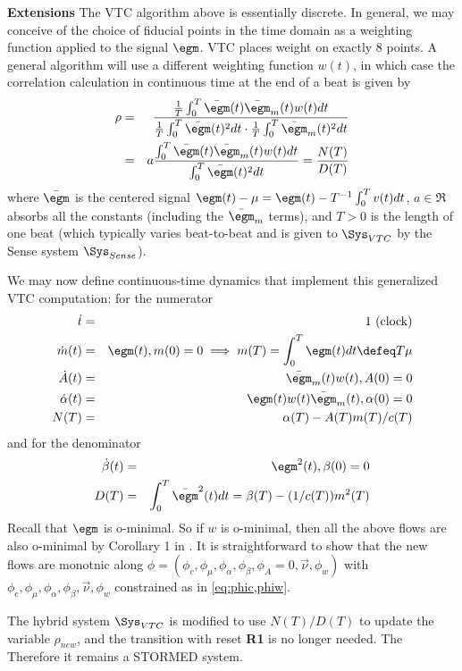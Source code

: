\textbf{Extensions}
The VTC algorithm above is essentially discrete.
In general, we may conceive of the choice of fiducial points in the time domain as a weighting function applied to the signal $\egm$.
VTC places weight on exactly 8 points. 
A general algorithm will use a different weighting function $w(t)$, in which case the correlation calculation in continuous time at the end of a beat is given by
\begin{eqnarray*}\rho &=& \frac{\frac{1}{T}\int_{0}^{T}\bar{\egm}(t)\bar{\egm}_m(t)w(t)dt}{\frac{1}{T}\int_{0}^{T}\bar{\egm}(t)^2dt \cdot \frac{1}{T}\int_{0}^{T}\bar{\egm}_m(t)^2 dt }   
	\\
&=& a \frac{\int_{0}^{T}\bar{\egm}(t)\bar{\egm}_m(t)w(t)dt}{\int_{0}^{T}\bar{\egm}(t)^2dt } = \frac{N(T)}{D(T)}   
\end{eqnarray*}
where $\bar{\egm}$ is the centered signal $\egm(t) - \mu = \egm(t) - T^{-1}\int_0^Tv(t)dt$, $a \in \Re$ absorbs all the constants (including the $\bar{\egm}_m$ terms), and $T>0$ is the length of one beat (which typically varies beat-to-beat and is given to $\Sys_{VTC}$ by the Sense system $\Sys_{Sense}$).

We may now define continuous-time dynamics that implement this generalized VTC computation:
for the numerator
\begin{eqnarray*}
\dot{t} &=& 1 \text{   (clock)}
\\
\dot{m}(t) &=& \egm(t), m(0) = 0 \implies m(T) = \int_0^T \egm(t)dt \defeq T\mu
\\
\dot{A}(t) &=& \bar{\egm}_m(t)w(t), A(0)= 0
\\
\dot{\alpha}(t) &=& \egm(t)w(t)\bar{\egm}_m(t), \alpha(0)=0
\\
N(T) &=& \alpha(T) - A(T)m(T)/c(T)
\end{eqnarray*}
and for the denominator
\begin{eqnarray*}
\dot{\beta}(t) &=& \egm^2(t), \beta(0) = 0
\\
D(T) &=& \int_{0}^{T}\bar{\egm}^2(t)dt = \beta(T)-(1/c(T))m^2(T)
\end{eqnarray*}
Recall that $\egm$ is o-minimal.
So if $w$ is o-minimal, then all the above flows are also o-minimal by Corollary 1 in \cite{Speissegger99_Pfaffian}.
It is straightforward to show that the new flows are monotnic along $\phi = (\phi_c, \phi_\mu,\phi_\alpha,\phi_\beta,\phi_A=0, \vec{\nu},\phi_w)$ with $\phi_c, \phi_\mu,\phi_\alpha,\phi_\beta, \vec{\nu},\phi_w$ constrained as in \eqref{eq:phic,phiw}.

The hybrid system $\Sys_{VTC}$ is modified to use $N(T)/D(T)$ to update the variable $\rho_{new}$, and the transition with reset \textbf{R1} is no longer needed.
The
Therefore it remains a STORMED system.